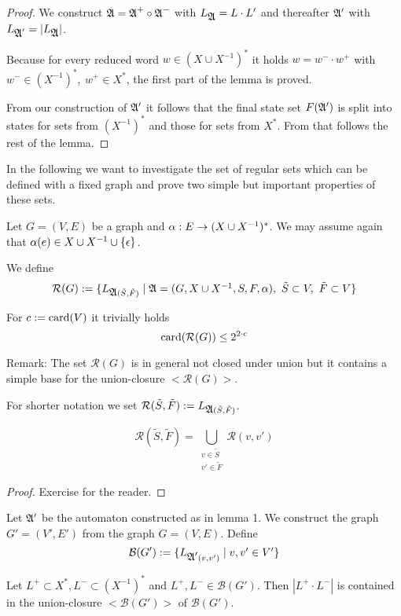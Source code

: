 \begin{proof}
We construct $\mbox{$\mathfrak{A}$} = \mbox{$\mathfrak{A}$}^+ \circ \mbox{$\mathfrak{A}$}^-$ with $L_{\mbox{$\mathfrak{A}$}} = L \cdot L'$ and
thereafter $\mbox{$\mathfrak{A'}$}$ with $L_{\mbox{$\mathfrak{A}$}'} = |L_{\mbox{$\mathfrak{A}$}}|$.

Because for every reduced word $w \in (X\cup X^{-1})^*$ it holds $w = w^- \cdot
w^+$ with $w^- \in (X^{-1})^*,\ w^+ \in X^*$, the first part of the lemma is
proved.

From our construction of $\mbox{$\mathfrak{A'}$}$ it follows that the final state set
$F(\mbox{$\mathfrak{A'}$})$ is split into states for sets from $(X^{-1})^*$ and those
for sets from $X^*$. From that follows the rest of the lemma.
\end{proof}

\bigskip
In the following we want to investigate the set of regular sets which can be
defined with a fixed graph and prove two simple but important properties of
these sets.

Let $G = (V, E)$ be a graph and $\alpha : E \to (X \cup {X}^{-1})^*$. We may
assume again that $\alpha(e) \in X \cup {X}^{-1} \cup \mbox{$\{\epsilon\}$}$.

We define
\[ \mathcal{R}(G) := \mbox{$\{L_{\mbox{$\mathfrak{A}$}(\tilde{S},\tilde{F})} \mid \mbox{$\mathfrak{A}$} = (G, X
\cup X^{-1}, S, F, \alpha),\ \tilde{S} \subset V,\ \tilde{F} \subset V\}$} \]

For $c := \mathrm{card}({V})$ it trivially holds 
\[ \mathrm{card}({\mathcal{R}(G)}) \leq 2^{2 \cdot c} \]

Remark: The set $\mathcal{R}(G)$ is in general not closed under union but it
contains a simple base for the union-closure ${<}\mathcal{R}(G){>}$.

For shorter notation we set $\mathcal{R}(\tilde{S},\tilde{F}) :=
L_{\mbox{$\mathfrak{A}$}(\tilde{S},\tilde{F})}$.

\begin{lemma}
\[ \mathcal{R}(\tilde{S},\tilde{F}) = \bigcup_{\substack{v \in \tilde{S}\\v'
\in \tilde{F}}} \mathcal{R}(v, v') \]
\end{lemma}

\begin{proof}
Exercise for the reader.
\end{proof}

\bigskip
Let $\mbox{$\mathfrak{A'}$}$ be the automaton constructed as in lemma 1. We construct the graph
$G' = (V', E')$ from the graph $G = (V, E)$. Define
\[ \mathcal{B}(G') := \mbox{$\{L_{\mbox{$\mathfrak{A'}$}(v, v')} \mid v, v' \in V'\}$} \]

\begin{lemma}
Let $L^+ \subset X^*, L^- \subset (X^{-1})^*$ and $L^+, L^- \in
\mathcal{B}(G')$. Then $|L^+ \cdot L^-|$ is contained in the union-closure
${<}\mathcal{B}(G'){>}$ of $\mathcal{B}(G')$.
\end{lemma}


